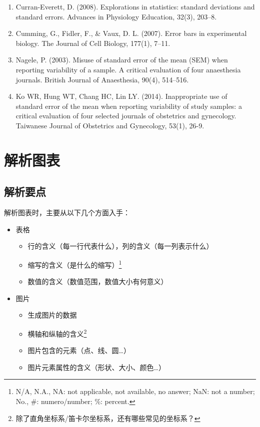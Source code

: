 \documentclass[11pt,a4paper,twoside]{book}
\begin{document}
{{\begin{enumerate}
  \item Curran-Everett, D. (2008). Explorations in statistics: standard deviations and standard errors. Advances in Physiology Education, 32(3), 203–8.
  \item Cumming, G., Fidler, F., \& Vaux, D. L. (2007). Error bars in experimental biology. The Journal of Cell Biology, 177(1), 7–11.
  \item Nagele, P. (2003). Misuse of standard error of the mean (SEM) when reporting variability of a sample. A critical evaluation of four anaesthesia journals. British Journal of Anaesthesia, 90(4), 514–516.
  \item Ko WR, Hung WT, Chang HC, Lin LY. (2014). Inappropriate use of standard error of the mean when reporting variability of study samples: a critical evaluation of four selected journals of obstetrics and gynecology. Taiwanese Journal of Obstetrics and Gynecology, 53(1), 26-9.
\end{enumerate}
}}

\section{解析图表}
\subsection{解析要点}
解析图表时，主要从以下几个方面入手：
\begin{itemize}
  \item 表格
    \begin{itemize}
      \item 行的含义（每一行代表什么），列的含义（每一列表示什么）
      \item 缩写的含义（是什么的缩写）\footnote{N/A, N.A., NA: not applicable, not available, no answer; NaN: not a number; No., \#: numero/number; \%: percent.}
      \item 数值的含义（数值范围，数值大小有何意义）
    \end{itemize}
  \item 图片
    \begin{itemize}
      \item 生成图片的数据
      \item 横轴和纵轴的含义\footnote{除了直角坐标系/笛卡尔坐标系，还有哪些常见的坐标系？}
      \item 图片包含的元素（点、线、圆\ldots）
      \item 图片元素属性的含义（形状、大小、颜色\ldots）
    \end{itemize}
\end{itemize}
\end{document}
